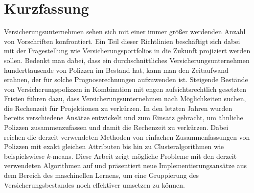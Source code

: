 

\chapter*{Kurzfassung}
\label{cha:kurzfassung}


Versicherungsunternehmen sehen sich mit einer immer größer werdenden Anzahl von Vorschriften konfrontiert. Ein Teil dieser Richtlinien beschäftigt sich dabei mit der Fragestellung wie Versicherungsportfolios in die Zukunft projiziert werden sollen. Bedenkt man dabei, dass ein durchschnittliches Versicherungsunternehmen hunderttausende von Polizzen im Bestand hat, kann man den Zeitaufwand erahnen, der für solche Prognoserechnungen aufzuwenden ist. Steigende Bestände von Versicherungspolizzen in Kombination mit engen aufsichtsrechtlich gesetzten Fristen führen dazu, dass Versicherungsunternehmen nach Möglichkeiten suchen, die Rechenzeit für Projektionen zu verkürzen. In den letzten Jahren wurden bereits verschiedene Ansätze entwickelt und zum Einsatz gebracht, um ähnliche Polizzen zusammenzufassen und damit die Rechenzeit zu verkürzen. Dabei reichen die derzeit verwendeten Methoden von einfachen Zusammenfassungen von Polizzen mit exakt gleichen Attributen bis hin zu Clusteralgorithmen wie beispielswiese $k$-means. Diese Arbeit zeigt mögliche Probleme mit den derzeit verwendeten Algorithmen auf und präsentiert neue Implementierungsansätze aus dem Bereich des maschinellen Lernens, um eine Gruppierung des Versicherungsbestandes noch effektiver umsetzen zu können.
